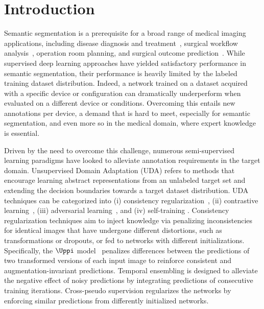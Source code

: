 \section{Introduction}
\label{sec:tist_introduction}

Semantic segmentation is a prerequisite for a broad range of medical imaging applications, including disease diagnosis and treatment~, surgical workflow analysis~, operation room planning, and surgical outcome prediction~. While supervised deep learning approaches have yielded satisfactory performance in semantic segmentation, their performance is heavily limited by the labeled training dataset distribution. Indeed, a network trained on a dataset acquired with a specific device or configuration can dramatically underperform when evaluated on a different device or conditions. Overcoming this entails new annotations per device, a demand that is hard to meet, especially for semantic segmentation, and even more so in the medical domain, where expert knowledge is essential.

Driven by the need to overcome this challenge, numerous semi-supervised learning paradigms have looked to alleviate annotation requirements in the target domain. Unsupervised Domain Adaptation (UDA) refers to methods that encourage learning abstract representations from an unlabeled target set and extending the decision boundaries towards a target dataset distribution. UDA techniques can be categorized into (i) consistency regularization~, (ii) contrastive learning~, (iii) adversarial learning~, and (iv) self-training . Consistency regularization techniques aim to inject knowledge via penalizing inconsistencies for identical images that have undergone different distortions, such as transformations or dropouts, or fed to networks with different initializations. Specifically, the $\Uppi$ model~ penalizes differences between the predictions of two transformed versions of each input image to reinforce consistent and augmentation-invariant predictions. Temporal ensembling is designed to alleviate the negative effect of noisy predictions by integrating predictions of consecutive training iterations. Cross-pseudo supervision regularizes the networks by enforcing similar predictions from differently initialized networks. 


